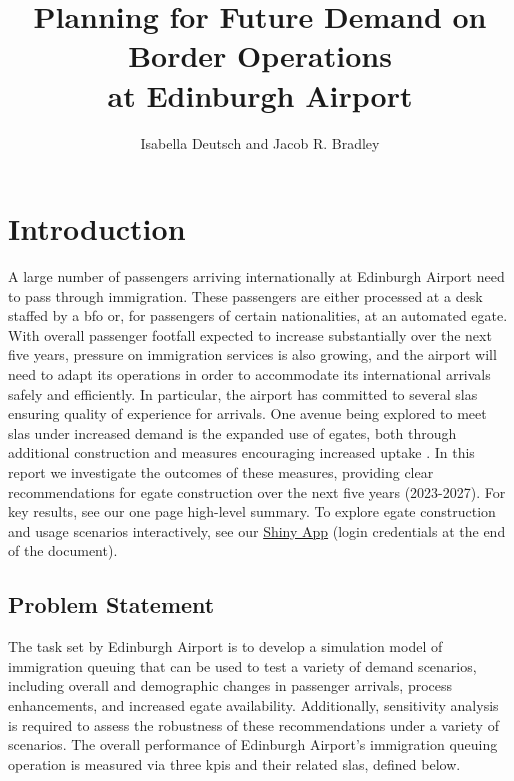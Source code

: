 \documentclass[10pt]{article}
\title{Planning for Future Demand on Border Operations\\ at Edinburgh Airport}
\author{Isabella Deutsch and Jacob R. Bradley}
\date{}
\begin{document}
\pagestyle{fancy}
\maketitle

\section{Introduction}
A large number of passengers arriving internationally at Edinburgh Airport need to pass through immigration. These passengers are either processed at a desk staffed by a \gls{bfo} or, for passengers of certain nationalities, at an automated \gls{egate}. With overall passenger footfall expected to increase substantially over the next five years, pressure on immigration services is also growing, and the airport will need to adapt its operations in order to accommodate its international arrivals safely and efficiently. In particular, the airport has committed to several \glspl{sla} ensuring quality of experience for arrivals. One avenue being explored to meet \glspl{sla} under increased demand is the expanded use of \glspl{egate}, both through additional construction and measures encouraging increased uptake \cite{UK_border_2025}. In this report we investigate the outcomes of these measures, providing clear recommendations for \gls{egate} construction over the next five years (2023-2027). For key results, see our one page high-level summary. To explore \gls{egate} construction and usage scenarios interactively, see our \href{https://jacob-bradley.shinyapps.io/shiny/}{Shiny App} (login credentials at the end of the document).

\subsection{Problem Statement}
The task set by Edinburgh Airport is to develop a simulation model of immigration queuing that can be used to test a variety of demand scenarios, including overall and demographic changes in passenger arrivals, process enhancements, and increased \gls{egate} availability. 
Additionally, sensitivity analysis is required to assess the robustness of these recommendations under a variety of scenarios.
The overall performance of Edinburgh Airport's immigration queuing operation is measured via three \glspl{kpi} and their related \glspl{sla}, defined below.
\end{document}
